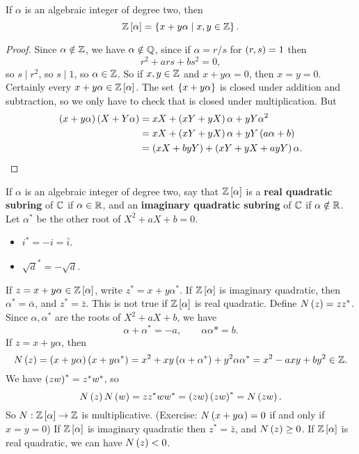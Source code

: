 \begin{proposition}
If $ \alpha $ is an algebraic integer of degree two, then
$$ \mathbb{Z}\left[ \alpha \right] = \left\{ x + y\alpha \mid x, y \in \mathbb{Z} \right\}. $$
\end{proposition}

\begin{proof}
Since $ \alpha \notin \mathbb{Z} $, we have $ \alpha \notin \mathbb{Q} $, since if $ \alpha = r / s $ for $ \left( r, s \right) = 1 $ then
$$ r^2 + ars + bs^2 = 0, $$
so $ s \mid r^2 $, so $ s \mid 1 $, so $ \alpha \in \mathbb{Z} $. So if $ x, y \in \mathbb{Z} $ and $ x + y\alpha = 0 $, then $ x = y = 0 $. Certainly every $ x + y\alpha \in \mathbb{Z}\left[ \alpha \right] $. The set $ \left\{ x + y\alpha \right\} $ is closed under addition and subtraction, so we only have to check that is closed under multiplication. But
\begin{align*}
\left( x + y\alpha \right)\left( X + Y\alpha \right)
& = xX + \left( xY + yX \right)\alpha + yY\alpha^2 \\
& = xX + \left( xY + yX \right)\alpha + yY\left( a\alpha + b \right) \\
& = \left( xX + byY \right) + \left( xY + yX + ayY \right)\alpha.
\end{align*}
\end{proof}

If $ \alpha $ is an algebraic integer of degree two, say that $ \mathbb{Z}\left[ \alpha \right] $ is a \textbf{real quadratic subring} of $ \mathbb{C} $ if $ \alpha \in \mathbb{R} $, and an \textbf{imaginary quadratic subring} of $ \mathbb{C} $ if $ \alpha \notin \mathbb{R} $. Let $ \alpha^* $ be the other root of $ X^2 + aX + b = 0 $.

\begin{example*}
\hfill
\begin{itemize}
\item $ i^* = -i = \bar{i} $.
\item $ \sqrt{d}^* = -\sqrt{d} $.
\end{itemize}
\end{example*}

If $ z = x + y\alpha \in \mathbb{Z}\left[ \alpha \right] $, write $ z^* = x + y\alpha^* $. If $ \mathbb{Z}\left[ \alpha \right] $ is imaginary quadratic, then $ \alpha^* = \bar{\alpha} $, and $ z^* = \bar{z} $. This is not true if $ \mathbb{Z}\left[ \alpha \right] $ is real quadratic. Define $ N\left( z \right) = zz^* $. Since $ \alpha, \alpha^* $ are the roots of $ X^2 + aX + b $, we have
$$ \alpha + \alpha^* = -a, \qquad \alpha\alpha* = b. $$
If $ z = x + y\alpha $, then
$$ N\left( z \right) = \left( x + y\alpha \right)\left( x + y\alpha^* \right) = x^2 + xy\left( \alpha + \alpha^* \right) + y^2\alpha\alpha^* = x^2 - axy + by^2 \in \mathbb{Z}. $$
We have $ \left( zw \right)^* = z^*w^* $, so
$$ N\left( z \right)N\left( w \right) = zz^*ww^* = \left( zw \right)\left( zw \right)^* = N\left( zw \right). $$
So $ N : \mathbb{Z}\left[ \alpha \right] \to \mathbb{Z} $ is multiplicative. (Exercise: $ N\left( x + y\alpha \right) = 0 $ if and only if $ x = y = 0 $) If $ \mathbb{Z}\left[ \alpha \right] $ is imaginary quadratic then $ z^* = \bar{z} $, and $ N\left( z \right) \ge 0 $. If $ \mathbb{Z}\left[ \alpha \right] $ is real quadratic, we can have $ N\left( z \right) < 0 $.

